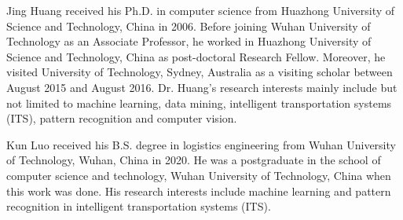 \documentclass[journal]{IEEEtran}
\begin{document}
\IEEEdisplaynontitleabstractindextext
\IEEEpeerreviewmaketitle












\begin{IEEEbiography}{Jing Huang} received his Ph.D. in computer science from Huazhong University of Science and Technology, China in 2006. Before joining Wuhan University of Technology as an Associate Professor, he worked in Huazhong University of Science and Technology, China as post-doctoral Research Fellow. Moreover, he visited University of Technology, Sydney, Australia as a visiting scholar between August 2015 and August 2016. Dr. Huang’s research interests mainly include but not limited to machine learning, data mining, intelligent transportation systems (ITS), pattern recognition and computer vision.
\end{IEEEbiography}

\begin{IEEEbiography}{Kun Luo} received his B.S. degree in logistics engineering from Wuhan University of Technology, Wuhan, China in 2020. He was a postgraduate in the school of computer science and technology, Wuhan University of Technology, China when this work was done. His research interests include machine learning and pattern recognition in intelligent transportation systems (ITS).
\end{IEEEbiography}
\end{document}
